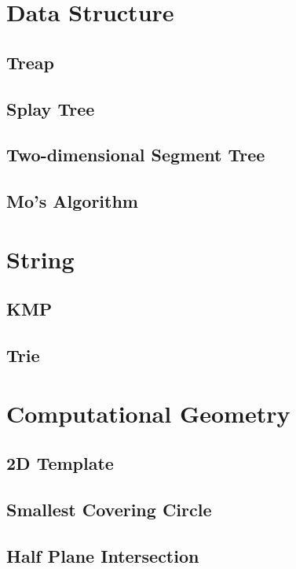 \documentclass[10pt,UTF8,a4paper,twoside]{ctexart}
\begin{document}
\begin{multicols}{2}
\section{Data Structure}
	\subsection{Treap}
	\subsection{Splay Tree}
	\subsection{Two-dimensional Segment Tree}
	\subsection{Mo's Algorithm}
		
\clearpage

\section{String}
	\subsection{KMP}
		
	\subsection{Trie}
		
\clearpage

\section{Computational Geometry}
	\subsection{2D Template}
		
	\subsection{Smallest Covering Circle}
		
	\subsection{Half Plane Intersection}
		
\clearpage


\end{multicols}
\end{document}
